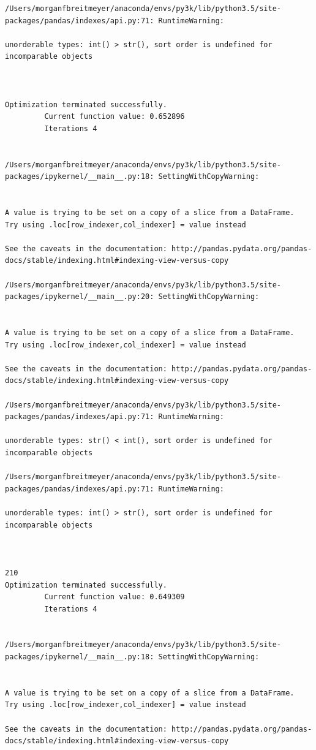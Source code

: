 \begin{lstlisting}
/Users/morganfbreitmeyer/anaconda/envs/py3k/lib/python3.5/site-packages/pandas/indexes/api.py:71: RuntimeWarning:

unorderable types: int() > str(), sort order is undefined for incomparable objects



Optimization terminated successfully.
         Current function value: 0.652896
         Iterations 4


/Users/morganfbreitmeyer/anaconda/envs/py3k/lib/python3.5/site-packages/ipykernel/__main__.py:18: SettingWithCopyWarning:


A value is trying to be set on a copy of a slice from a DataFrame.
Try using .loc[row_indexer,col_indexer] = value instead

See the caveats in the documentation: http://pandas.pydata.org/pandas-docs/stable/indexing.html#indexing-view-versus-copy

/Users/morganfbreitmeyer/anaconda/envs/py3k/lib/python3.5/site-packages/ipykernel/__main__.py:20: SettingWithCopyWarning:


A value is trying to be set on a copy of a slice from a DataFrame.
Try using .loc[row_indexer,col_indexer] = value instead

See the caveats in the documentation: http://pandas.pydata.org/pandas-docs/stable/indexing.html#indexing-view-versus-copy

/Users/morganfbreitmeyer/anaconda/envs/py3k/lib/python3.5/site-packages/pandas/indexes/api.py:71: RuntimeWarning:

unorderable types: str() < int(), sort order is undefined for incomparable objects

/Users/morganfbreitmeyer/anaconda/envs/py3k/lib/python3.5/site-packages/pandas/indexes/api.py:71: RuntimeWarning:

unorderable types: int() > str(), sort order is undefined for incomparable objects



210
Optimization terminated successfully.
         Current function value: 0.649309
         Iterations 4


/Users/morganfbreitmeyer/anaconda/envs/py3k/lib/python3.5/site-packages/ipykernel/__main__.py:18: SettingWithCopyWarning:


A value is trying to be set on a copy of a slice from a DataFrame.
Try using .loc[row_indexer,col_indexer] = value instead

See the caveats in the documentation: http://pandas.pydata.org/pandas-docs/stable/indexing.html#indexing-view-versus-copy


\end{lstlisting}
